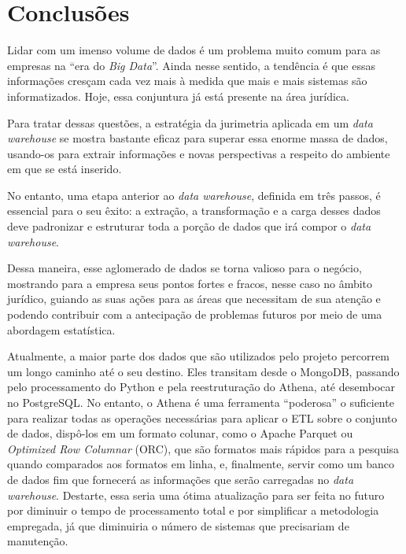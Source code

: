 \section{Conclusões}
\label{sec:conclusao}

Lidar com um imenso volume de dados é um problema muito comum para as empresas na \enquote{era do \textit{Big Data}}. Ainda nesse sentido, a tendência é que essas informações cresçam cada vez mais à medida que mais e mais sistemas são informatizados. Hoje, essa conjuntura já está presente na área jurídica.

Para tratar dessas questões, a estratégia da jurimetria aplicada em um \textit{data warehouse} se mostra bastante eficaz para superar essa enorme massa de dados, usando-os para extrair informações e novas perspectivas a respeito do ambiente em que se está inserido.

No entanto, uma etapa anterior ao \textit{data warehouse}, definida em três passos, é essencial para o seu êxito: a extração, a transformação e a carga desses dados deve padronizar e estruturar toda a porção de dados que irá compor o \textit{data warehouse}.

Dessa maneira, esse aglomerado de dados se torna valioso para o negócio, mostrando para a empresa seus pontos fortes e fracos, nesse caso no âmbito jurídico, guiando as suas ações para as áreas que necessitam de sua atenção e podendo contribuir com a antecipação de problemas futuros por meio de uma abordagem estatística.

Atualmente, a maior parte dos dados que são utilizados pelo projeto percorrem um longo caminho até o seu destino. Eles transitam desde o MongoDB, passando pelo processamento do Python e pela reestruturação do Athena, até desembocar no PostgreSQL. No entanto, o Athena é uma ferramenta \enquote{poderosa} o suficiente para realizar todas as operações necessárias para aplicar o ETL sobre o conjunto de dados, dispô-los em um formato colunar, como o Apache Parquet ou \textit{Optimized Row Columnar} (ORC), que são formatos mais rápidos para a pesquisa quando comparados aos formatos em linha, e, finalmente, servir como um banco de dados fim que fornecerá as informações que serão carregadas no \textit{data warehouse}. Destarte, essa seria uma ótima atualização para ser feita no futuro por diminuir o tempo de processamento total e por simplificar a metodologia empregada, já que diminuiria o número de sistemas que precisariam de manutenção.